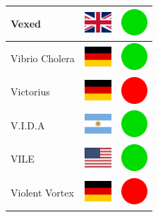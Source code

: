 \documentclass[12pt, a4paper, twoside]{report}
\begin{document}
\begin{center}
\begin{longtable}{|p{5cm}|p{2cm}|p{2cm}|}
 Vexed                                                      & \includegraphics[width=1cm]{../img/flags/gb} &   \includegraphics[width=1cm]{../likes/y} \\ \hline
 Vibrio Cholera                                             & \includegraphics[width=1cm]{../img/flags/de} &   \includegraphics[width=1cm]{../likes/y} \\ \hline
 Victorius                                                  & \includegraphics[width=1cm]{../img/flags/de} &   \includegraphics[width=1cm]{../likes/n} \\ \hline
 V.I.D.A                                                    & \includegraphics[width=1cm]{../img/flags/ar} &   \includegraphics[width=1cm]{../likes/y} \\ \hline
 VILE                                                       & \includegraphics[width=1cm]{../img/flags/us} &   \includegraphics[width=1cm]{../likes/y} \\ \hline
 Violent Vortex                                             & \includegraphics[width=1cm]{../img/flags/de} &   \includegraphics[width=1cm]{../likes/n} \\ \hline

\end{longtable}
\end{center}
\end{document}
